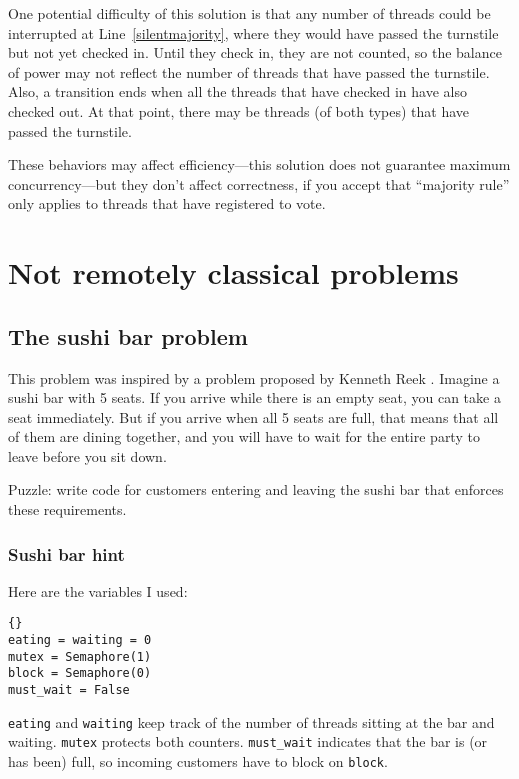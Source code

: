 \documentclass{book}
\newcommand{\clearemptydoublepage}{\newpage\cleardoublepage}
\begin{document}
One potential difficulty of this solution is that any number
of threads could be interrupted at Line~\ref{silentmajority},
where they would have passed the turnstile but not yet checked in.
Until they check in, they are not counted, so the balance of
power may not reflect the number of threads that have passed the
turnstile.  Also, a transition ends when all the threads that have
checked in have also checked out.  At that point, there may
be threads (of both types) that have passed the turnstile.

These behaviors may affect efficiency---this solution does
not guarantee maximum concurrency---but they don't affect
correctness, if you accept that ``majority rule'' only applies
to threads that have registered to vote.


\clearemptydoublepage
\chapter{Not remotely classical problems}


\section{The sushi bar problem}

This problem was inspired by a problem proposed by Kenneth Reek \cite{reek}.
Imagine a sushi bar with 5 seats.  If you arrive while there is an
empty seat, you can take a seat immediately.  But if you arrive when
all 5 seats are full, that means that all of them are dining together,
and you will have to wait for the entire party to leave before you
sit down.

Puzzle: write code for customers entering and
leaving the sushi bar that enforces these requirements.

\clearemptydoublepage
\subsection {Sushi bar hint}

Here are the variables I used:

\begin{lstlisting}[title={Sushi bar hint}]{}
eating = waiting = 0
mutex = Semaphore(1)
block = Semaphore(0)
must_wait = False
\end{lstlisting}

{\tt eating} and {\tt waiting} keep track of the number of
threads sitting at the bar and waiting.  {\tt mutex} protects
both counters.  {\tt must\_wait} indicates that the bar is (or
has been) full, so incoming customers have to block
on {\tt block}.
\end{document}
